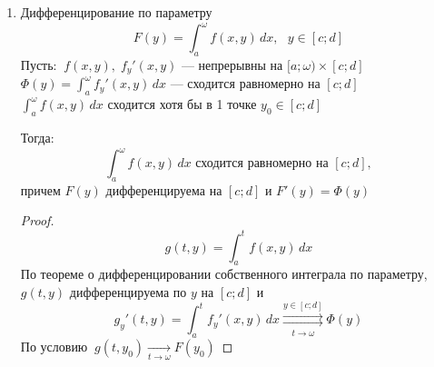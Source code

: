 \begin{properties}
\begin{enumerate}
        Тогда $F(y)$ непрерывна на $[c; d]$
        \begin{proof}
            \[ g(t, y) = \int_a^t f(x, y)\,dx \text{ --- непрерывна по } y \in [c; d] \ \ \forall t \in (a; \omega) \]
            \[ \int_a^t f(x, y)\,dx \text{ --- сходится равномерно} \;\Leftrightarrow\; g(t, y) 
            \overset{y \in [c; d]}{\underset{t \to \omega}{\rightrightarrows}} F(y) \]
            Равномерно сходящееся семейство непрерывных функций сходится к непрерывной функции:
            \[ |F(y) - F(y_0)| \le \underset{< \text{\large$\frac{\varepsilon}{3}$} \ 
            \begin{array}{l} \forall t \in U(\omega) \\[-7 pt] 
            \forall y \in H \end{array}}{\underbrace{\left| F(y) - g(t, y) \right|}} + 
            \underset{< \text{\large$\frac{\varepsilon}{3}$} \ \begin{array}{c} 
            \text{\footnotesize При фикс. } t \in U(\omega) \\[-7 pt] |y - y_0| < \delta \end{array}}
            {\underbrace{\left| g(t, y) - g(t, y_0) \right|}} + 
            \underset{< \text{\large$\frac{\varepsilon}{3}$} \ \begin{array}{l} \forall t \in U(\omega) \\[-7 pt] 
            \forall y \in H \end{array}}
            {\underbrace{\left| g(t, y_0) - F(y_0) \right|}} < \varepsilon \ \ 
            \forall \varepsilon > 0 \]
        \end{proof}
        
        \item Дифференцирование по параметру
        \[ F(y) = \int_a^{\omega} f(x, y)\,dx, \ \ \ y \in [c; d] \]
        Пусть: $\ f(x, y), \; f_y'(x, y)$ --- непрерывны на $[a; \omega) \times [c; d]$ \\
        \phantom{Пусть} $\Phi(y) = \int_a^{\omega} f_y'(x, y)\,dx$ --- сходится равномерно на $[c; d]$ \\
        \phantom{Пусть} $\int_a^{\omega} f(x, y)\,dx$ сходится хотя бы в 1 точке $y_0 \in [c; d]$
        
        Тогда:
        \[ \int_a^{\omega} f(x, y)\,dx \text{ сходится равномерно на } [c; d], \]
        причем $F(y)$ дифференцируема на $[c; d]$ и $F'(y) = \Phi(y)$
        \begin{proof}
            \[ g(t, y) = \int_a^t f(x, y)\,dx \]
            По теореме о дифференцировании собственного интеграла по параметру, $g(t, y)$ дифференцируема по $y$ на $[c; d]$ и 
            \[ g_y'(t, y) = \int_a^t f_y'(x, y)\,dx \overset{y \in [c; d]}{\underset{t \to \omega}{\rightrightarrows}} \Phi(y) \]
            По условию $\ g(t, y_0) \xrightarrow[t \to \omega]{} F(y_0)$
            

\end{proof}
\end{enumerate}
\end{properties}
